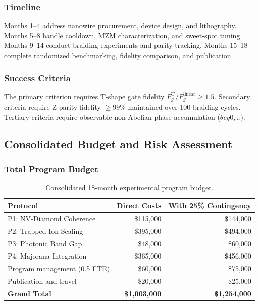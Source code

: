 \subsubsection{Timeline}

Months 1--4 address nanowire procurement, device design, and lithography. Months 5--8 handle cooldown, MZM characterization, and sweet-spot tuning. Months 9--14 conduct braiding experiments and parity tracking. Months 15--18 complete randomized benchmarking, fidelity comparison, and publication.

\subsubsection{Success Criteria}

The primary criterion requires T-shape gate fidelity $F_g^{\mathrm{T}} / F_g^{\mathrm{linear}} \geq 1.5$. Secondary criteria require Z-parity fidelity $\geq 99\%$ maintained over 100 braiding cycles. Tertiary criteria require observable non-Abelian phase accumulation ($\theta
eq 0, \pi$).


\subsection{Consolidated Budget and Risk Assessment}

\subsubsection{Total Program Budget}

\begin{table}[h]
\caption{Consolidated 18-month experimental program budget.}
\label{tab:total_budget}
\begin{ruledtabular}
\begin{tabular}{lrr}
\textbf{Protocol} & \textbf{Direct Costs} & \textbf{With 25\% Contingency} \\
\hline
P1: NV-Diamond Coherence & \$115,000 & \$144,000 \\
P2: Trapped-Ion Scaling & \$395,000 & \$494,000 \\
P3: Photonic Band Gap & \$48,000 & \$60,000 \\
P4: Majorana Integration & \$365,000 & \$456,000 \\
\hline
Program management (0.5 FTE) & \$60,000 & \$75,000 \\
Publication and travel & \$20,000 & \$25,000 \\
\hline
\textbf{Grand Total} & \textbf{\$1,003,000} & \textbf{\$1,254,000} \\
\end{tabular}
\end{ruledtabular}
\end{table}

